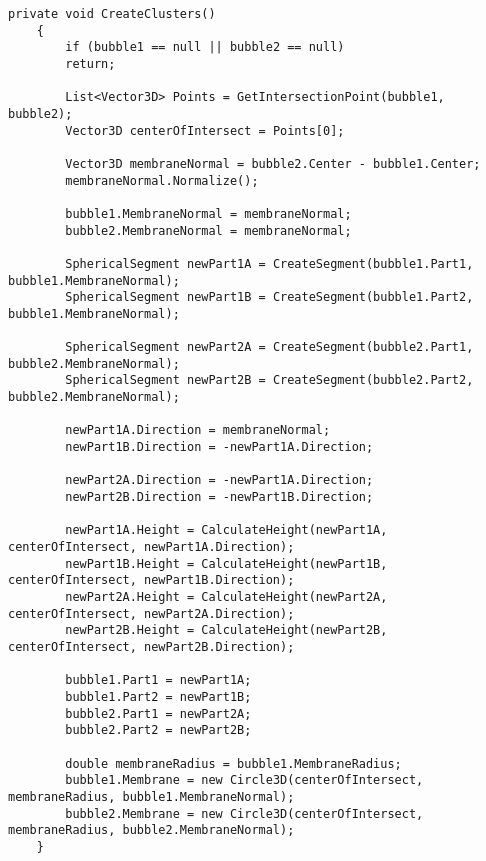 \begin{lstlisting}[label=lst:create_bubble_cluster, caption=Реализация создания пузырькового кластера]
	private void CreateClusters()
	{
		if (bubble1 == null || bubble2 == null)
		return;
		
		List<Vector3D> Points = GetIntersectionPoint(bubble1, bubble2);
		Vector3D centerOfIntersect = Points[0];
		
		Vector3D membraneNormal = bubble2.Center - bubble1.Center;
		membraneNormal.Normalize();
		
		bubble1.MembraneNormal = membraneNormal;
		bubble2.MembraneNormal = membraneNormal;
		
		SphericalSegment newPart1A = CreateSegment(bubble1.Part1, bubble1.MembraneNormal);
		SphericalSegment newPart1B = CreateSegment(bubble1.Part2, bubble1.MembraneNormal);
		
		SphericalSegment newPart2A = CreateSegment(bubble2.Part1, bubble2.MembraneNormal);
		SphericalSegment newPart2B = CreateSegment(bubble2.Part2, bubble2.MembraneNormal);
		
		newPart1A.Direction = membraneNormal;
		newPart1B.Direction = -newPart1A.Direction;
		
		newPart2A.Direction = -newPart1A.Direction;
		newPart2B.Direction = -newPart1B.Direction;
		
		newPart1A.Height = CalculateHeight(newPart1A, centerOfIntersect, newPart1A.Direction);
		newPart1B.Height = CalculateHeight(newPart1B, centerOfIntersect, newPart1B.Direction);
		newPart2A.Height = CalculateHeight(newPart2A, centerOfIntersect, newPart2A.Direction);
		newPart2B.Height = CalculateHeight(newPart2B, centerOfIntersect, newPart2B.Direction);
		
		bubble1.Part1 = newPart1A;
		bubble1.Part2 = newPart1B;
		bubble2.Part1 = newPart2A;
		bubble2.Part2 = newPart2B;
		
		double membraneRadius = bubble1.MembraneRadius;
		bubble1.Membrane = new Circle3D(centerOfIntersect, membraneRadius, bubble1.MembraneNormal);
		bubble2.Membrane = new Circle3D(centerOfIntersect, membraneRadius, bubble2.MembraneNormal);
	}
\end{lstlisting}

